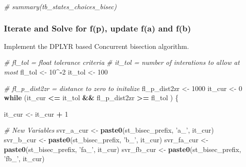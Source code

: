 \documentclass[
]{book}
\newenvironment{Shaded}{\begin{snugshade}}{\end{snugshade}}
\newcommand{\CommentTok}[1]{\textcolor[rgb]{0.56,0.35,0.01}{\textit{#1}}}
\newcommand{\ControlFlowTok}[1]{\textcolor[rgb]{0.13,0.29,0.53}{\textbf{#1}}}
\newcommand{\DecValTok}[1]{\textcolor[rgb]{0.00,0.00,0.81}{#1}}
\newcommand{\KeywordTok}[1]{\textcolor[rgb]{0.13,0.29,0.53}{\textbf{#1}}}
\newcommand{\NormalTok}[1]{#1}
\newcommand{\OperatorTok}[1]{\textcolor[rgb]{0.81,0.36,0.00}{\textbf{#1}}}
\newcommand{\StringTok}[1]{\textcolor[rgb]{0.31,0.60,0.02}{#1}}
\begin{document}
\begin{Shaded}
\begin{Highlighting}[]
\CommentTok{# summary(tb_states_choices_bisec)}
\end{Highlighting}
\end{Shaded}

\hypertarget{iterate-and-solve-for-fp-update-fa-and-fb}{%
\subsubsection{Iterate and Solve for f(p), update f(a) and f(b)}\label{iterate-and-solve-for-fp-update-fa-and-fb}}

Implement the DPLYR based Concurrent bisection algorithm.

\begin{Shaded}
\begin{Highlighting}[]
\CommentTok{# fl_tol = float tolerance criteria}
\CommentTok{# it_tol = number of interations to allow at most}
\NormalTok{fl_tol <-}\StringTok{ }\DecValTok{10}\OperatorTok{^-}\DecValTok{2}
\NormalTok{it_tol <-}\StringTok{ }\DecValTok{100}

\CommentTok{# fl_p_dist2zr = distance to zero to initalize}
\NormalTok{fl_p_dist2zr <-}\StringTok{ }\DecValTok{1000}
\NormalTok{it_cur <-}\StringTok{ }\DecValTok{0}
\ControlFlowTok{while}\NormalTok{ (it_cur }\OperatorTok{<=}\StringTok{ }\NormalTok{it_tol }\OperatorTok{&&}\StringTok{ }\NormalTok{fl_p_dist2zr }\OperatorTok{>=}\StringTok{ }\NormalTok{fl_tol ) \{}

\NormalTok{  it_cur <-}\StringTok{ }\NormalTok{it_cur }\OperatorTok{+}\StringTok{ }\DecValTok{1}

  \CommentTok{# New Variables}
\NormalTok{  svr_a_cur <-}\StringTok{ }\KeywordTok{paste0}\NormalTok{(st_bisec_prefix, }\StringTok{'a_'}\NormalTok{, it_cur)}
\NormalTok{  svr_b_cur <-}\StringTok{ }\KeywordTok{paste0}\NormalTok{(st_bisec_prefix, }\StringTok{'b_'}\NormalTok{, it_cur)}
\NormalTok{  svr_fa_cur <-}\StringTok{ }\KeywordTok{paste0}\NormalTok{(st_bisec_prefix, }\StringTok{'fa_'}\NormalTok{, it_cur)}
\NormalTok{  svr_fb_cur <-}\StringTok{ }\KeywordTok{paste0}\NormalTok{(st_bisec_prefix, }\StringTok{'fb_'}\NormalTok{, it_cur)}


\end{Highlighting}
\end{Shaded}
\end{document}
